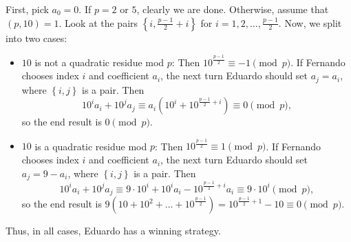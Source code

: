First, pick $a_0=0$. If $p=2$ or $5$, clearly we are done. Otherwise, assume that $\left(p,10\right)=1$. Look at the pairs $\left\{i,\frac{p-1}{2}+i\right\}$ for $i=1,2,\ldots,\frac{p-1}{2}$. Now, we split into two cases:

\begin{itemize}
	
	\item $10$ is not a quadratic residue mod $p$: Then $10^{\frac{p-1}{2}}\equiv-1\pmod p$. If Fernando chooses index $i$ and coefficient $a_i$, the next turn Eduardo should set $a_j=a_i$, where $\left\{i,j\right\}$ is a pair. Then \[10^ia_i+10^ja_j\equiv a_i\left(10^i+10^{\frac{p-1}{2}+i}\right)\equiv0\pmod p,\] so the end result is $0\pmod p$.
	
	\item $10$ is a quadratic residue mod $p$: Then $10^{\frac{p-1}{2}}\equiv1\pmod p$. If Fernando chooses index $i$ and coefficient $a_i$, the next turn Eduardo should set $a_j=9-a_i$, where $\left\{i,j\right\}$ is a pair. Then \[10^ia_i+10^ja_j\equiv9\cdot10^i+10^ia_i-10^{\frac{p-1}{2}+i}a_i\equiv9\cdot10^i\pmod p,\] so the end result is $9\left(10+10^2+\ldots+10^{\frac{p-1}{2}}\right)=10^{\frac{p-1}{2}+1}-10\equiv0\pmod p$.
	
\end{itemize}

Thus, in all cases, Eduardo has a winning strategy.